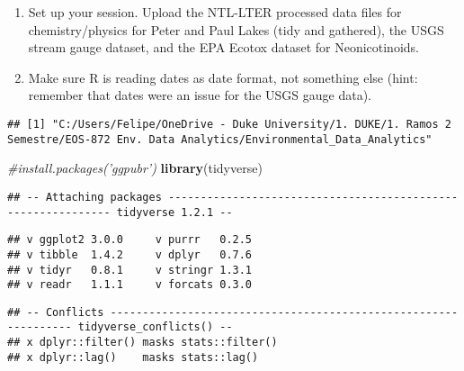 \documentclass[]{article}
\newenvironment{Shaded}{\begin{snugshade}}{\end{snugshade}}
\newcommand{\KeywordTok}[1]{\textcolor[rgb]{0.13,0.29,0.53}{\textbf{#1}}}
\newcommand{\DataTypeTok}[1]{\textcolor[rgb]{0.13,0.29,0.53}{#1}}
\newcommand{\CommentTok}[1]{\textcolor[rgb]{0.56,0.35,0.01}{\textit{#1}}}
\newcommand{\OtherTok}[1]{\textcolor[rgb]{0.56,0.35,0.01}{#1}}
\newcommand{\OperatorTok}[1]{\textcolor[rgb]{0.81,0.36,0.00}{\textbf{#1}}}
\newcommand{\NormalTok}[1]{#1}
\begin{document}
\begin{enumerate}
\def\labelenumi{\arabic{enumi}.}
\item
  Set up your session. Upload the NTL-LTER processed data files for
  chemistry/physics for Peter and Paul Lakes (tidy and gathered), the
  USGS stream gauge dataset, and the EPA Ecotox dataset for
  Neonicotinoids.
\item
  Make sure R is reading dates as date format, not something else (hint:
  remember that dates were an issue for the USGS gauge data).
\end{enumerate}

\begin{Shaded}
\end{Shaded}

\begin{verbatim}
## [1] "C:/Users/Felipe/OneDrive - Duke University/1. DUKE/1. Ramos 2 Semestre/EOS-872 Env. Data Analytics/Environmental_Data_Analytics"
\end{verbatim}

\begin{Shaded}
\begin{Highlighting}[]
\CommentTok{#install.packages('ggpubr')}
\KeywordTok{library}\NormalTok{(tidyverse)}
\end{Highlighting}
\end{Shaded}

\begin{verbatim}
## -- Attaching packages ------------------------------------------------------------- tidyverse 1.2.1 --
\end{verbatim}

\begin{verbatim}
## v ggplot2 3.0.0     v purrr   0.2.5
## v tibble  1.4.2     v dplyr   0.7.6
## v tidyr   0.8.1     v stringr 1.3.1
## v readr   1.1.1     v forcats 0.3.0
\end{verbatim}

\begin{verbatim}
## -- Conflicts ---------------------------------------------------------------- tidyverse_conflicts() --
## x dplyr::filter() masks stats::filter()
## x dplyr::lag()    masks stats::lag()
\end{verbatim}
\end{document}
